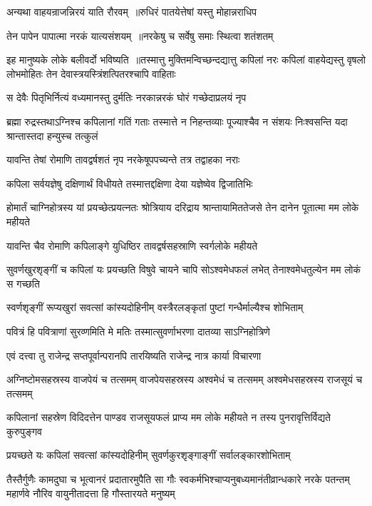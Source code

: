 \twolineshloka
{अन्यथा वाहयन्राजन्निरयं याति रौरवम् ॥रुधिरं पातयेत्तेषां यस्तु मोहान्नराधिप}
{}


\twolineshloka
{तेन पापेन पापात्मा नरकं यात्यसंशयम् ॥नरकेषु च सर्वेषु समाः स्थित्वा शतंशतम्}
{}


इह मानुष्यके लोके बलीवर्दो भविष्यति ॥तस्मात्तु मुक्तिमन्विच्छन्दद्यात्तु कपिलां नरः
\twolineshloka
{कपिलां वाहयेद्यस्तु वृषलो लोभमोहितः}
{तेन देवास्त्रयस्त्रिंशत्पितरश्चापि वाहिताः}


\twolineshloka
{स देवैः पितृभिर्नित्यं वध्यमानस्तु दुर्मतिः}
{नरकान्नरकं घोरं गच्छेदाप्रलयं नृप}


\threelineshloka
{ब्रह्मा रुद्रस्तथाऽग्निश्च कपिलानां गतिं गताः}
{तस्मात्ते न निहन्तव्याः पूज्याश्चैव न संशयः}
{निःश्वसन्ति यदा श्रान्तास्तदा हन्युस्च तत्कुलं}


\twolineshloka
{यावन्ति तेषां रोमाणि तावद्वर्षशतं नृप}
{नरकेषूपपच्यन्ते तत्र तद्वाहका नराः}


\twolineshloka
{कपिला सर्वयज्ञेषु दक्षिणार्थं विधीयते}
{तस्मात्तद्दक्षिणा देया यज्ञेष्वेव द्विजातिभिः}


\threelineshloka
{होमार्तं चाग्निहोत्रस्य यां प्रयच्छेत्प्रयत्नतः}
{श्रोत्रियाय दरिद्राय श्रान्तायामिततेजसे}
{तेन दानेन पूतात्मा मम लोके महीयते}


\twolineshloka
{यावन्ति चैव रोमाणि कपिलाङ्गे युधिष्ठिर}
{तावद्वर्षसहस्राणि स्वर्गलोके महीयते}


\threelineshloka
{सुवर्णखुरशृङ्गीं च कपिलां यः प्रयच्छति}
{विषुवे चायने चापि सोऽश्वमेधफलं लभेत्}
{तेनाश्वमेधतुल्येन मम लोकं स गच्छति}


\twolineshloka
{स्वर्णशृङ्गीं रूप्यखुरां सवत्सां कांस्यदोहिनीम्}
{वस्त्रैरलङ्कृतां पुष्टां गन्धैर्माल्यैश्च शोभिताम्}


\twolineshloka
{पवित्रं हि पवित्राणां सुरव्णमिति मे मतिः}
{तस्मात्सुवर्णाभरणा दातव्या साऽग्निहोत्रिणे}


\twolineshloka
{एवं दत्त्वा तु राजेन्द्र सप्तपूर्वान्परानपि}
{तारयिष्यति राजेन्द्र नात्र कार्या विचारणा}


\threelineshloka
{अग्निष्टोमसहस्रस्य वाजपेयं च तत्समम्}
{वाजपेयसहस्रस्य अश्वमेधं च तत्समम्}
{अश्वमेधसहस्रस्य राजसूयं च तत्समम्}


\threelineshloka
{कपिलानां सहस्रेण विदिदत्तेन पाण्डव}
{राजसूयफलं प्राप्य मम लोके महीयते}
{न तस्य पुनरावृत्तिर्विद्यते कुरुपुङ्गव}


\twolineshloka
{प्रयच्छते यः कपिलां सवत्सां कांस्यदोहिनीम्}
{सुवर्णकुरशृङ्गाङ्गीं सर्वालङ्कारशोभिताम्}


\threelineshloka
{तैस्तैर्गुणैः कामदुघा च भूत्वानरं प्रदातारमुपैति सा गौः}
{स्वकर्मभिश्चाप्यनुबध्यमानंतीव्रान्धकारे नरके पतन्तम्}
{महार्णवे नौरिव वायुनीतादत्ता हि गौस्तारयते मनुष्यम्}


